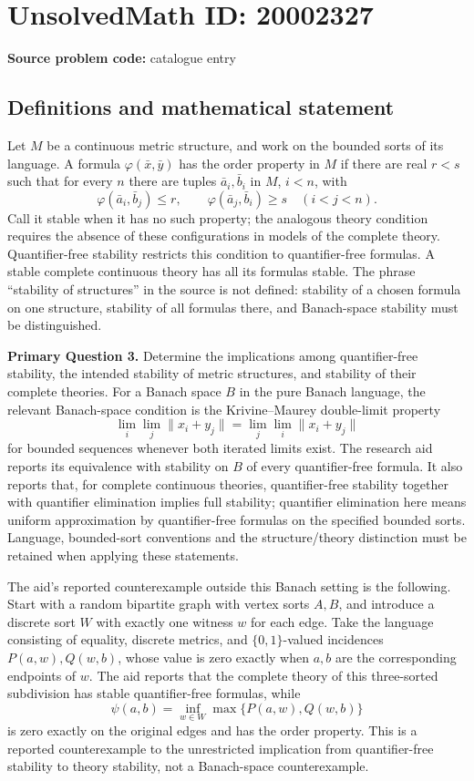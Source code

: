 \documentclass[11pt]{article}
\begin{document}
\section*{UnsolvedMath ID: 20002327}
\textbf{Source problem code:} catalogue entry
\subsection{Definitions and mathematical statement}
Let \(M\) be a continuous metric structure, and work on the bounded sorts of its language. A formula \(\varphi(\bar x,\bar y)\) has the order property in \(M\) if there are real \(r<s\) such that for every \(n\) there are tuples \(\bar a_i,\bar b_i\) in \(M\), \(i<n\), with
\[
 \varphi(\bar a_i,\bar b_j)\leq r,\qquad
 \varphi(\bar a_j,\bar b_i)\geq s\quad(i<j<n).
\]
Call it stable when it has no such property; the analogous theory condition requires the absence of these configurations in models of the complete theory. Quantifier-free stability restricts this condition to quantifier-free formulas. A stable complete continuous theory has all its formulas stable. The phrase ``stability of structures'' in the source is not defined: stability of a chosen formula on one structure, stability of all formulas there, and Banach-space stability must be distinguished.

\textbf{Primary Question 3.} Determine the implications among quantifier-free stability, the intended stability of metric structures, and stability of their complete theories. For a Banach space \(B\) in the pure Banach language, the relevant Banach-space condition is the Krivine--Maurey double-limit property
\[
 \lim_i\lim_j\|x_i+y_j\|=\lim_j\lim_i\|x_i+y_j\|
\]
for bounded sequences whenever both iterated limits exist. The research aid reports its equivalence with stability on \(B\) of every quantifier-free formula. It also reports that, for complete continuous theories, quantifier-free stability together with quantifier elimination implies full stability; quantifier elimination here means uniform approximation by quantifier-free formulas on the specified bounded sorts. Language, bounded-sort conventions and the structure/theory distinction must be retained when applying these statements.

The aid's reported counterexample outside this Banach setting is the following. Start with a random bipartite graph with vertex sorts \(A,B\), and introduce a discrete sort \(W\) with exactly one witness \(w\) for each edge. Take the language consisting of equality, discrete metrics, and \(\{0,1\}\)-valued incidences \(P(a,w),Q(w,b)\), whose value is zero exactly when \(a,b\) are the corresponding endpoints of \(w\). The aid reports that the complete theory of this three-sorted subdivision has stable quantifier-free formulas, while
\[
 \psi(a,b)=\inf_{w\in W}\max\{P(a,w),Q(w,b)\}
\]
is zero exactly on the original edges and has the order property. This is a reported counterexample to the unrestricted implication from quantifier-free stability to theory stability, not a Banach-space counterexample.
\end{document}
